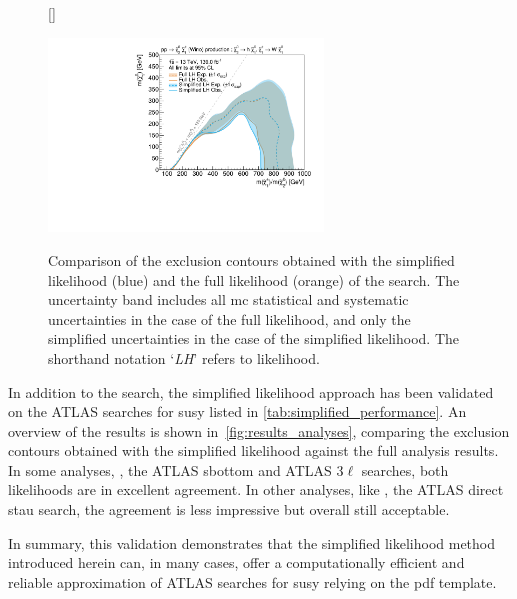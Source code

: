 \begin{figure}
[\FBwidth]
{\caption{Comparison of the exclusion contours obtained with the simplified likelihood (blue) and the full likelihood (orange) of the \onelepton search. The uncertainty band includes all \gls{mc} statistical and systematic uncertainties in the case of the full likelihood, and only the simplified uncertainties in the case of the simplified likelihood. The shorthand notation `\textit{LH}' refers to likelihood.}\label{fig:results_simplify_1Lbb}}
{\includegraphics[width=0.65\textwidth]{exclusion_1Lbb_noLabel_v2}}
\end{figure}

In addition to the \onelepton search, the simplified likelihood approach has been validated on the ATLAS searches for \gls{susy} listed in \cref{tab:simplified_performance}. An overview of the results is shown in~\cref{fig:results_analyses}, comparing the exclusion contours obtained with the simplified likelihood against the full analysis results. In some analyses, \eg, the ATLAS sbottom and ATLAS $3\ell$ searches, both likelihoods are  in excellent agreement. In other analyses, like \eg, the ATLAS direct stau search, the agreement is less impressive but overall still acceptable.

In summary, this validation demonstrates that the simplified likelihood method introduced herein can, in many cases, offer a computationally efficient and reliable approximation of ATLAS searches for \gls{susy} relying on the  \gls{pdf} template.


